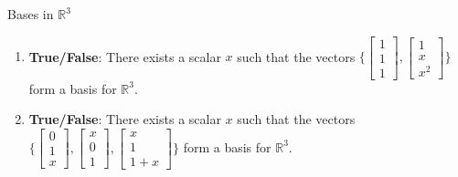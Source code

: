 \begin{frame}{Bases in $\mathbb{R}^3$}
    \begin{enumerate}
        \item \textbf{True/False}: There exists a scalar $x$ such that the vectors 
        $\bigg\{
            \begin{bmatrix} 
                1 \\ 1 \\ 1 
            \end{bmatrix}, 
            \begin{bmatrix}
                1 \\ x \\ x^2
            \end{bmatrix}
        \bigg\}$ form a basis for $\mathbb{R}^3$.\\[2ex]
        \item \textbf{True/False}: There exists a scalar $x$ such that the vectors 
        $\bigg\{
            \begin{bmatrix} 
                0 \\ 1 \\ x 
            \end{bmatrix}, 
            \begin{bmatrix}
                x \\ 0 \\ 1
            \end{bmatrix},
            \begin{bmatrix}
                x \\ 1 \\ 1 + x
            \end{bmatrix}
        \bigg\}$ form a basis for $\mathbb{R}^3$.
    \end{enumerate}
\end{frame}

